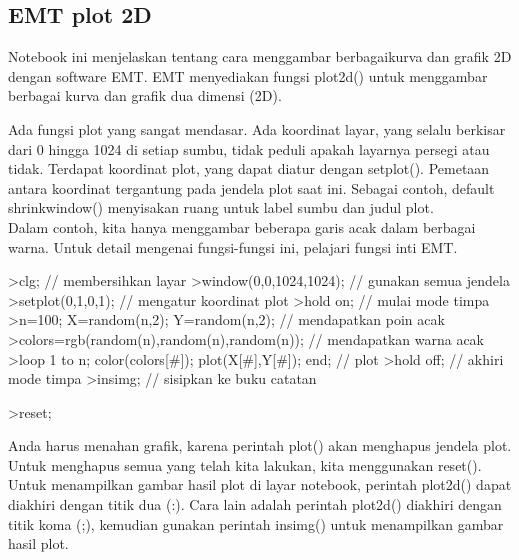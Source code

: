 \documentclass[12pt,Times new roman,letterpaper]{book}
\begin{document}
\begin{eulernootebook}
\begin{eulercomment}
\begin{eulercomment}
\begin{eulernootebook}
\begin{eulercomment}
\begin{eulercomment}
\begin{eulercomment}
\begin{eulercomment}
\begin{eulercomment}
\begin{eulercomment}
\begin{eulercomment}
\chapter{EMT plot 2D}
\begin{eulernotebook}
\begin{eulercomment}
Notebook ini menjelaskan tentang cara menggambar berbagaikurva dan
grafik 2D dengan software EMT. EMT menyediakan fungsi plot2d() untuk
menggambar berbagai kurva dan grafik dua dimensi (2D).\\
\end{eulercomment}
\begin{eulercomment}
Ada fungsi plot yang sangat mendasar. Ada koordinat layar, yang selalu
berkisar dari 0 hingga 1024 di setiap sumbu, tidak peduli apakah
layarnya persegi atau tidak. Terdapat koordinat plot, yang dapat
diatur dengan setplot(). Pemetaan antara koordinat tergantung pada
jendela plot saat ini. Sebagai contoh, default shrinkwindow()
menyisakan ruang untuk label sumbu dan judul plot.\\
Dalam contoh, kita hanya menggambar beberapa garis acak dalam berbagai
warna. Untuk detail mengenai fungsi-fungsi ini, pelajari fungsi inti
EMT.
\end{eulercomment}
\begin{eulerprompt}
>clg; // membersihkan layar
>window(0,0,1024,1024); // gunakan semua jendela
>setplot(0,1,0,1); // mengatur koordinat plot
>hold on; // mulai mode timpa
>n=100; X=random(n,2); Y=random(n,2);  // mendapatkan poin acak
>colors=rgb(random(n),random(n),random(n)); // mendapatkan warna acak
>loop 1 to n; color(colors[#]); plot(X[#],Y[#]); end; // plot
>hold off; // akhiri mode timpa
>insimg; // sisipkan ke buku catatan
\end{eulerprompt}
\begin{eulerprompt}
>reset;
\end{eulerprompt}
\begin{eulercomment}
Anda harus menahan grafik, karena perintah plot() akan menghapus
jendela plot. Untuk menghapus semua yang telah kita lakukan, kita
menggunakan reset().\\
Untuk menampilkan gambar hasil plot di layar notebook, perintah
plot2d() dapat diakhiri dengan titik dua (:). Cara lain adalah
perintah plot2d() diakhiri dengan titik koma (;), kemudian gunakan
perintah insimg() untuk menampilkan gambar hasil plot.\\

\end{eulercomment}
\end{eulernotebook}
\end{eulercomment}
\end{eulercomment}
\end{eulercomment}
\end{eulercomment}
\end{eulercomment}
\end{eulercomment}
\end{eulercomment}
\end{eulernootebook}
\end{eulercomment}
\end{eulercomment}
\end{eulernootebook}
\end{document}
